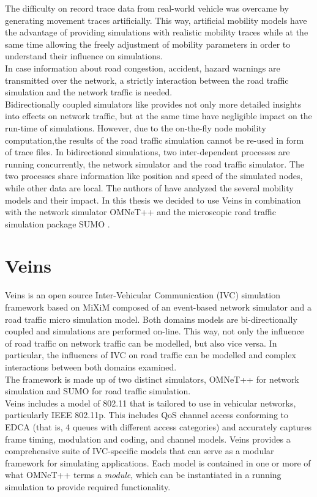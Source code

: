 The difficulty on record trace data from real-world vehicle was overcame by generating movement traces artificially.
This way, artificial mobility models have the advantage of providing simulations with realistic mobility traces while at the same time allowing the freely adjustment of mobility parameters in order to understand their influence on simulations.\\
In case information about road congestion, accident, hazard warnings are transmitted over the network, a strictly interaction between the road traffic simulation and the network traffic is needed. \\
Bidirectionally coupled simulators like \cite{sommer2008need} provides not only more detailed insights into effects on network traffic, but at the same time have negligible impact on the run-time of simulations.
However, due to the on-the-fly node mobility computation,the results of the road traffic simulation cannot be re-used in form of trace files.
In bidirectional simulations, two inter-dependent processes are running concurrently, the network simulator and the road traffic simulator. The two processes share information like position and speed of the simulated nodes, while other data are local. The authors of \cite{sommer2008progressing} have analyzed the several mobility models and their impact.
In this thesis we decided to use Veins \cite{sommer2011bid} in combination with the network simulator OMNeT++ \cite{varga2001omnetpp} and the microscopic road traffic simulation package SUMO \cite{krajzewicz2002sumo}.
\section{Veins}
\label{sec:456}
Veins is an open source Inter-Vehicular Communication (IVC) simulation framework based on MiXiM \cite{kopke2008simulating} composed of an event-based network simulator and a road traffic micro simulation model. Both domains models are bi-directionally coupled and simulations are performed on-line. This way, not only the influence of road traffic on network traffic can be modelled, but also vice versa. In particular, the influences of IVC on road traffic can be modelled and complex interactions between both domains examined.\\
The framework is made up of two distinct simulators, OMNeT++ for network simulation and SUMO for road traffic simulation. \\
Veins includes a model of 802.11 that is tailored to use in vehicular networks, particularly IEEE 802.11p. This includes QoS channel access conforming to EDCA (that is, 4 queues with different access categories) and accurately captures frame timing, modulation and coding, and channel models.
Veins provides a comprehensive suite of IVC-specific models that can serve as a modular framework for simulating applications. Each model is contained in one or more of what OMNeT++ terms a \emph{module}, which can be instantiated in a running simulation to provide required functionality.
